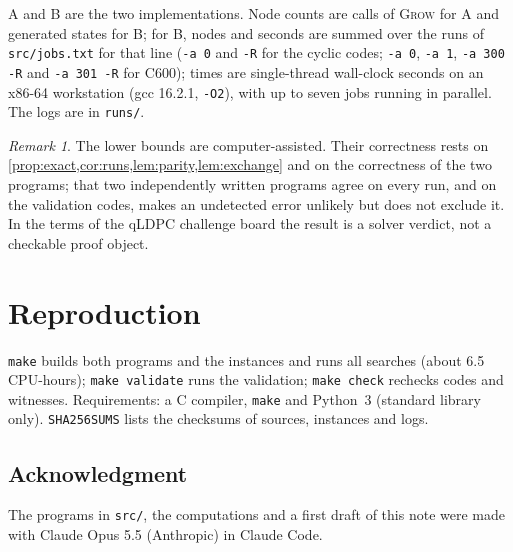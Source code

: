 \documentclass[11pt]{amsart}
\theoremstyle{definition}
\theoremstyle{remark}
\newtheorem{remark}[theorem]{Remark}
\begin{document}
A and B are the two implementations. Node counts are calls of \textsc{Grow} for A and generated states for B; for B, nodes and seconds are summed over the runs of \texttt{src/jobs.txt} for that line (\texttt{-a 0} and \texttt{-R} for the cyclic codes; \texttt{-a 0}, \texttt{-a 1}, \texttt{-a 300 -R} and \texttt{-a 301 -R} for C600); times are single-thread wall-clock seconds on an x86-64 workstation (gcc 16.2.1, \texttt{-O2}), with up to seven jobs running in parallel. The logs are in \texttt{runs/}.

\begin{remark}
The lower bounds are computer-assisted. Their correctness rests on \cref{prop:exact,cor:runs,lem:parity,lem:exchange} and on the correctness of the two programs; that two independently written programs agree on every run, and on the validation codes, makes an undetected error unlikely but does not exclude it. In the terms of the qLDPC challenge board the result is a solver verdict, not a checkable proof object.
\end{remark}

\section{Reproduction}

\texttt{make} builds both programs and the instances and runs all searches (about 6.5 CPU-hours); \texttt{make validate} runs the validation; \texttt{make check} rechecks codes and witnesses. Requirements: a C compiler, \texttt{make} and Python~3 (standard library only). \texttt{SHA256SUMS} lists the checksums of sources, instances and logs.

\subsection*{Acknowledgment}
The programs in \texttt{src/}, the computations and a first draft of this note were made with Claude Opus 5.5 (Anthropic) in Claude Code.
\end{document}
